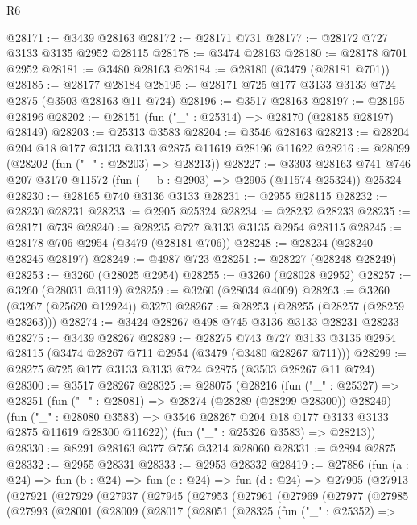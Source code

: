 \begin{lexlean}{R6}
\begin{coremodule}
@28171 := @3439 @28163
@28172 := @28171 @731
@28177 := @28172 @727 @3133 @3135 @2952 @28115
@28178 := @3474 @28163
@28180 := @28178 @701 @2952
@28181 := @3480 @28163
@28184 := @28180 (@3479 (@28181 @701))
@28185 := @28177 @28184
@28195 := @28171 @725 @177 @3133 @3133 @724 @2875 (@3503 @28163 @11 @724)
@28196 := @3517 @28163
@28197 := @28195 @28196
@28202 := @28151 (fun ("_" : @25314) => @28170 (@28185 @28197) @28149)
@28203 := @25313 @3583
@28204 := @3546 @28163
@28213 := @28204 @204 @18 @177 @3133 @3133 @2875 @11619 @28196 @11622
@28216 := @28099 (@28202 (fun ("_" : @28203) => @28213))
@28227 := @3303
    @28163
    @741
    @746
    @207
    @3170
    @11572
    (fun (__b : @2903) => @2905 (@11574 @25324))
    @25324
@28230 := @28165 @740 @3136 @3133
@28231 := @2955 @28115
@28232 := @28230 @28231
@28233 := @2905 @25324
@28234 := @28232 @28233
@28235 := @28171 @738
@28240 := @28235 @727 @3133 @3135 @2954 @28115
@28245 := @28178 @706 @2954 (@3479 (@28181 @706))
@28248 := @28234 (@28240 @28245 @28197)
@28249 := @4987 @723
@28251 := @28227 (@28248 @28249)
@28253 := @3260 (@28025 @2954)
@28255 := @3260 (@28028 @2952)
@28257 := @3260 (@28031 @3119)
@28259 := @3260 (@28034 @4009)
@28263 := @3260 (@3267 (@25620 @12924)) @3270
@28267 := @28253 (@28255 (@28257 (@28259 @28263)))
@28274 := @3424 @28267 @498 @745 @3136 @3133 @28231 @28233
@28275 := @3439 @28267
@28289 := @28275
    @743
    @727
    @3133
    @3135
    @2954
    @28115
    (@3474 @28267 @711 @2954 (@3479 (@3480 @28267 @711)))
@28299 := @28275 @725 @177 @3133 @3133 @724 @2875 (@3503 @28267 @11 @724)
@28300 := @3517 @28267
@28325 := @28075
    (@28216
      (fun ("_" : @25327) =>
      @28251
        (fun ("_" : @28081) => @28274 (@28289 (@28299 @28300)) @28249)
        (fun ("_" : @28080 @3583) =>
        @3546 @28267 @204 @18 @177 @3133 @3133 @2875 @11619 @28300 @11622))
      (fun ("_" : @25326 @3583) => @28213))
@28330 := @8291 @28163 @377 @756 @3214 @28060
@28331 := @2894 @2875
@28332 := @2955 @28331
@28333 := @2953 @28332
@28419 := @27886
    (fun (a : @24) =>
    fun (b : @24) =>
    fun (c : @24) =>
    fun (d : @24) =>
    @27905
      (@27913
        (@27921
          (@27929
            (@27937
              (@27945
                (@27953
                  (@27961
                    (@27969
                      (@27977
                        (@27985
                          (@27993
                            (@28001
                              (@28009
                                (@28017
                                  (@28051
                                    (@28325
                                      (fun ("_" : @25352) =>

\end{coremodule}
\end{lexlean}
